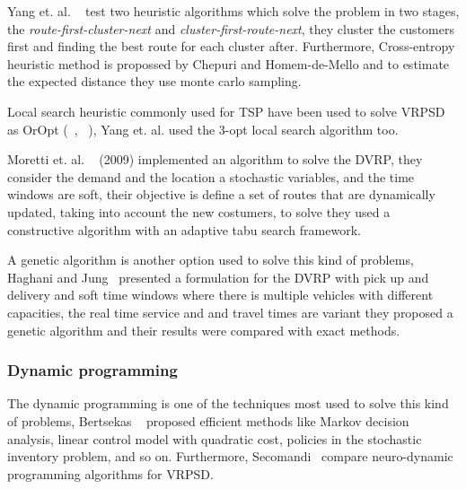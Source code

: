 Yang et. al. ~\cite{yang_stochastic_2000} test two heuristic algorithms which solve the problem in two stages, the \textit{route-first-cluster-next} and \textit{cluster-first-route-next}, they cluster the customers  first and finding the best route for each cluster after. Furthermore, Cross-entropy heuristic method is propossed by Chepuri and Homem-de-Mello \cite{Chepuri} and to estimate the expected distance they use monte carlo sampling.

Local search heuristic commonly used for TSP have been used to solve VRPSD as OrOpt (~\cite{yang_stochastic_2000}, ~\cite{bianchi_hybrid_2006}), Yang et. al. used the 3-opt local search algorithm too.

Moretti et. al. ~\cite{Moretti} (2009) implemented an algorithm to solve the DVRP, they consider the demand and the location a stochastic variables, and the time windows are soft, their objective is define a set of routes that are dynamically updated, taking into account the new costumers, to solve they used a constructive algorithm with an adaptive tabu search framework.

A genetic algorithm is another option used to solve this kind of problems, Haghani and Jung~\cite{haghani_dynamic_2005} presented a formulation for the DVRP with pick up and delivery and soft time windows  where there is multiple vehicles with different capacities, the real time service and and travel times are variant they proposed a genetic algorithm and their results were compared with exact methods.

\subsubsection{Dynamic programming}


The dynamic programming is one of the techniques most used to solve this kind of problems, Bertsekas ~\cite{Bertsekas} proposed efficient methods like Markov decision analysis, linear control model with quadratic cost, policies in the stochastic inventory problem, and so on. Furthermore, Secomandi~\cite{secomandi_comparing_2000} compare neuro-dynamic programming algorithms for VRPSD.

